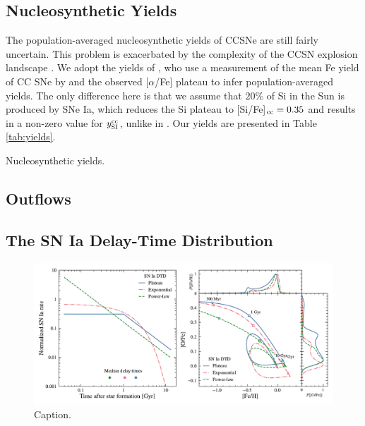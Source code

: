 \documentclass[twocolumn,twocolappendix,linenumbers]{aastex631}
\newcommand{\aFe}{[$\alpha$/Fe]\xspace}
\begin{document}
\subsection{Nucleosynthetic Yields}
\label{sec:yields}

The population-averaged nucleosynthetic yields of CCSNe are still fairly uncertain. This problem is exacerbated by the complexity of the CCSN explosion landscape \citep{sukhbold_core-collapse_2016}. We adopt the yields of \citet{weinberg_scale_2023}, who use a measurement of the mean Fe yield of CC SNe by \citet{rodriguez_iron_2023} and the observed \aFe plateau to infer population-averaged yields. The only difference here is that we assume that $20\%$ of Si in the Sun is produced by SNe Ia, which reduces the Si plateau to [Si/Fe]$_{\rm cc}=0.35$ and results in a non-zero value for $y_{\rm SI}^{\rm cc}$, unlike in \citet{weinberg_scale_2023}. Our yields are presented in Table \ref{tab:yields}.

\begin{table}
    \centering
    \caption{Nucleosynthetic yields.}
    \label{tab:yields}
    
\end{table}

\subsection{Outflows}
\label{sec:outflows}



\subsection{The SN Ia Delay-Time Distribution}
\label{sec:dtd}

\begin{figure}
    \centering
    \includegraphics{figures/delay_time_distribution.pdf}
    \caption{Caption.}
    \label{fig:dtd}
\end{figure}
\end{document}
